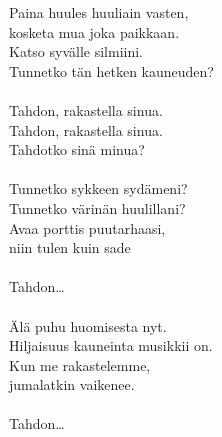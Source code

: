 
        Paina huules huuliain vasten, \\
        kosketa mua joka paikkaan. \\
        Katso syvälle silmiini. \\
        Tunnetko tän hetken kauneuden? \\
\hspace{10mm} \\
        Tahdon, rakastella sinua. \\
        Tahdon, rakastella sinua. \\
        Tahdotko sinä minua? \\
\hspace{10mm} \\
        Tunnetko sykkeen sydämeni? \\
        Tunnetko värinän huulillani? \\
        Avaa porttis puutarhaasi, \\
        niin tulen kuin sade \\
\hspace{10mm} \\
        Tahdon… \\
\hspace{10mm} \\
        Älä puhu huomisesta nyt. \\
        Hiljaisuus kauneinta musikkii on. \\
        Kun me rakastelemme, \\
        jumalatkin vaikenee. \\
\hspace{10mm} \\
        Tahdon… \\
